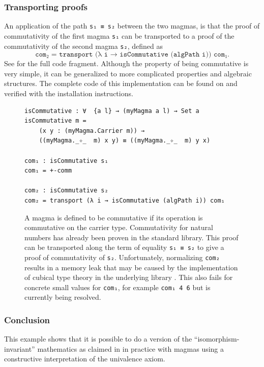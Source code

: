 \documentclass[12pt,a4paper,twoside,xetex]{book} %
\begin{document}
\subsubsection{Transporting proofs}


An application of the path \texttt{s₁ ≡ s₂} between the two magmas, is that the 
proof of commutativity of the first magma \texttt{s₁} can be transported to a 
proof of the commutativity of the second magma \texttt{s₂}, defined as 
$$\texttt{com₂ = transport (λ i → isCommutative (algPath i)) com₁}.$$ See  for the full code fragment. Although the 
property of being commutative is very simple, it can be generalized to more 
complicated properties and algebraic structures. The 
complete code of this implementation can be found on \cite{Van19} and verified 
with the installation instructions.

\begin{figure}\label{comtrans}
\begin{center}
\begin{BVerbatim}
isCommutative : ∀  {a l} → (myMagma a l) → Set a
isCommutative m = 
    (x y : (myMagma.Carrier m)) → 
    ((myMagma._✧_  m) x y) ≡ ((myMagma._✧_  m) y x)

com₁ : isCommutative s₁
com₁ = +-comm

com₂ : isCommutative s₂
com₂ = transport (λ i → isCommutative (algPath i)) com₁
\end{BVerbatim}
\end{center}
\caption{A magma is defined to be commutative if its operation is 
commutative on the carrier type. Commutativity for natural numbers has already 
been proven in the standard library. This proof can be transported along the 
term of equality \texttt{s₁ ≡ s₂} to give a proof of commutativity of 
\texttt{s₂}. Unfortunately, normalizing \texttt{com₂} results in a memory leak that may be caused by the implementation of cubical type theory in the underlying library \cite{Moertberg2018}. This also fails for concrete small values for \texttt{com₁}, for example \texttt{com₁ 4 6} but is currently being resolved.} 
\end{figure}

\subsubsection{Conclusion}

This example shows that it is possible to do a version of the ``isomorphism-invariant'' mathematics as claimed in \cite{Voevodsky2013} in practice with magmas using a constructive interpretation of the univalence axiom. 
\end{document}
